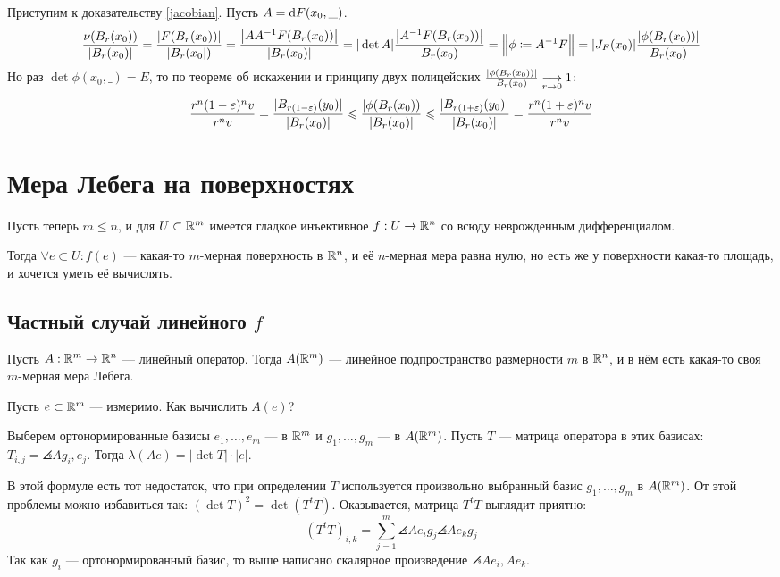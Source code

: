 \documentclass[a4paper]{report}
\begin{document}
    Приступим к доказательству \eqref{jacobian}.
    Пусть $A = \operatorname{d}\! F(x_0, \_)$.
    \[\frac{\nu(B_r(x_0))}{|B_r(x_0)|} = \frac{|F(B_r(x_0))|}{|B_r(x_0|)} = \frac{\left|AA^{-1}F(B_r(x_0))\right|}{\left|B_r(x_0)\right|} = |\det A|\frac{\left|A^{-1}F(B_r(x_0))\right|}{B_r(x_0)} =\Big\|\phi \coloneqq A^{-1}F\Big\|= |J_F(x_0)|\frac{|\phi(B_r(x_0))|}{B_r(x_0)}\]
    Но раз $\det \phi(x_0, \_) =E$, то по теореме об искажении и принципу двух полицейских ${\frac{|\phi(B_r(x_0))|}{B_r(x_0)} \underset{r \to 0}{\longrightarrow} 1}$:
    \[\frac{r^n (1 - \varepsilon)^n v}{r^n v} = \frac{|B_{r(1 - \varepsilon)}(y_0)|}{|B_r(x_0)|} \leqslant \frac{|\phi(B_r(x_0))}{|B_r(x_0)|}\leqslant \frac{|B_{r(1 + \varepsilon)}(y_0)|}{|B_r(x_0)|} = \frac{r^n(1 + \varepsilon)^n v}{r^n v}\]


    \section{Мера Лебега на поверхностях}
    Пусть теперь $m \le n$, и для $U \subset \mathbb{R}^m$ имеется гладкое инъективное $f: U \rightarrow \mathbb{R}^n$ со всюду неврожденным дифференциалом.

    Тогда $\forall e \subset U: f(e)$ --- какая-то $m$-мерная поверхность в $\mathbb{R}^n$, и её $n$-мерная мера равна нулю, но есть же у поверхности какая-то площадь, и хочется уметь её вычислять.

    \subsection{Частный случай линейного $f$}
    Пусть $A: \mathbb{R}^m \rightarrow \mathbb{R}^n$ --- линейный оператор.
    Тогда $A(\mathbb{R}^m)$ --- линейное подпространство размерности $m$ в $\mathbb{R}^n$, и в нём есть какая-то своя $m$-мерная мера Лебега.

    Пусть $e \subset \mathbb{R}^m$ --- измеримо.
    Как вычислить $A(e)$?

    Выберем ортонормированные базисы $e_1, \dots, e_m$ --- в $\mathbb{R}^m$ и $g_1, \dots, g_m$ --- в $A(\mathbb{R}^m)$.
    Пусть $T$ --- матрица оператора в этих базисах: $T_{i,j} = \angles{A g_i, e_j}$.
    Тогда $\lambda(Ae) = |\det T|\cdot|e|$.

    В этой формуле есть тот недостаток, что при определении $T$ используется произвольно выбранный базис $g_1, \dots, g_m$ в $A(\mathbb{R}^m)$.
    От этой проблемы можно избавиться так: $(\det T)^2 = \det(T^t T)$.
    Оказывается, матрица $T^t T$ выглядит приятно:
    \[(T^t T)_{i,k} = \sum\limits_{j = 1}^{m}\angles{A e_i g_j}\angles{A e_k g_j}\]
    Так как $g_{i}$ --- ортонормированный базис, то выше написано скалярное произведение $\angles{Ae_i, A e_k}$.
\end{document}
